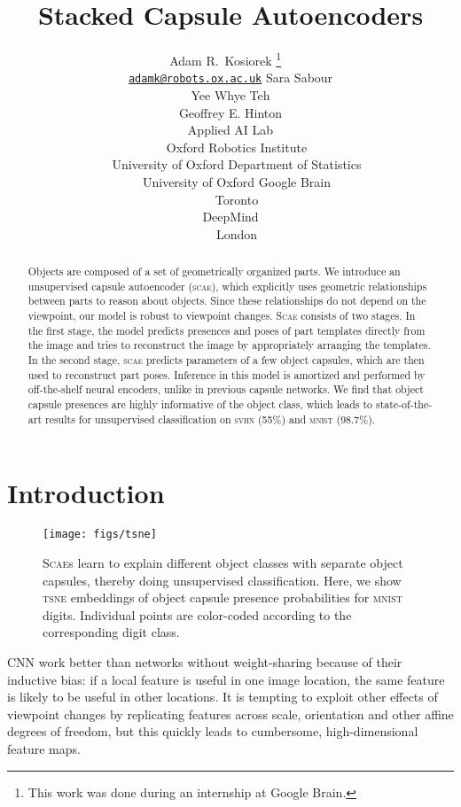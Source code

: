 \documentclass{article}
\title{
Stacked Capsule Autoencoders}
\author{
  Adam R.~Kosiorek
  \!\thanks{This work was done during an internship at Google Brain.}
  \  \\
  \href{mailto:adamk@robots.ox.ac.uk}{\texttt{adamk@robots.ox.ac.uk}}
  \And
  Sara Sabour\\
  \And
  Yee Whye Teh\\
  \And
  Geoffrey E. Hinton \\
  \AND
   Applied AI Lab\\
  \ \ Oxford Robotics Institute \\
  \ \  University of Oxford
  \And
 Department of Statistics \\
  \ \ University of Oxford
  \And
   Google Brain\\
  \ \ Toronto \\
  \And
   DeepMind\\
  \ \ London \\
}
\begin{document}
\maketitle

\begin{abstract}
Objects are composed of a set of geometrically organized parts. We introduce an unsupervised capsule autoencoder (\textsc{scae}), which explicitly uses geometric relationships between parts to reason about objects.
 Since these relationships do not depend on the viewpoint, our model is robust to viewpoint changes.
\textsc{Scae} consists of two stages.
In the first stage, the model predicts presences and poses of part templates directly from the image and tries to reconstruct the image by appropriately arranging the templates.
In the second stage, \textsc{scae} predicts parameters of a few object capsules, which are then used to reconstruct part poses.
Inference in this model is amortized and performed by off-the-shelf neural encoders, unlike in previous capsule networks.
We find that object capsule presences are highly informative of the object class, which leads to state-of-the-art results for unsupervised classification on \textsc{svhn} (55\%) and \textsc{mnist} (98.7\%).
\end{abstract} \section{Introduction}

\begin{wrapfigure}{r}{.3\textwidth}
	\centering
	\texttt{[image: figs/tsne]}
	\caption{
		\textsc{Scae}s learn to explain different object classes with separate object capsules, thereby doing unsupervised classification. 
		Here, we show \textsc{tsne} embeddings of object capsule presence probabilities for  \textsc{mnist} digits.
		Individual points are color-coded according to the corresponding digit class.
	}
	\label{fig:tsne}
	\vspace*{-2em}
\end{wrapfigure}

\Gls{CNN} work better than networks without weight-sharing because of their inductive bias: if a local feature is useful in one image location, the same feature is likely to be useful in other locations. It is tempting to exploit other effects of viewpoint changes by replicating features across scale, orientation and other affine degrees of freedom, but this quickly leads to cumbersome, high-dimensional feature maps.
\end{document}
